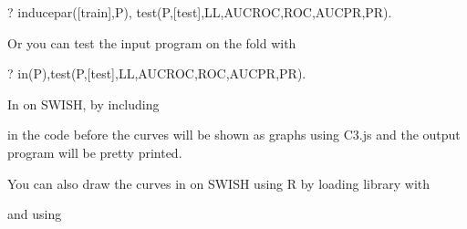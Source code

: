 \documentclass[letterpaper,10pt,english]{sphinxmanual}
\begin{document}
\begin{sphinxVerbatim}[commandchars=\\\{\}]
?\PYGZhy{} induce\PYGZus{}par([train],P),
test(P,[test],LL,AUCROC,ROC,AUCPR,PR).
\end{sphinxVerbatim}

Or you can test the input program on the fold  with

\begin{sphinxVerbatim}[commandchars=\\\{\}]
?\PYGZhy{} in(P),test(P,[test],LL,AUCROC,ROC,AUCPR,PR).
\end{sphinxVerbatim}

In  on SWISH, by including

\begin{sphinxVerbatim}[commandchars=\\\{\}]
 
 
\end{sphinxVerbatim}

in the code before  the curves will be shown as graphs using C3.js and the output program will be pretty printed.

You can also draw the curves in  on SWISH using R by loading library  with

\begin{sphinxVerbatim}[commandchars=\\\{\}]
 
\end{sphinxVerbatim}

and using

\begin{sphinxVerbatim}[commandchars=\\\{\}]
  
\end{sphinxVerbatim}
\end{document}
